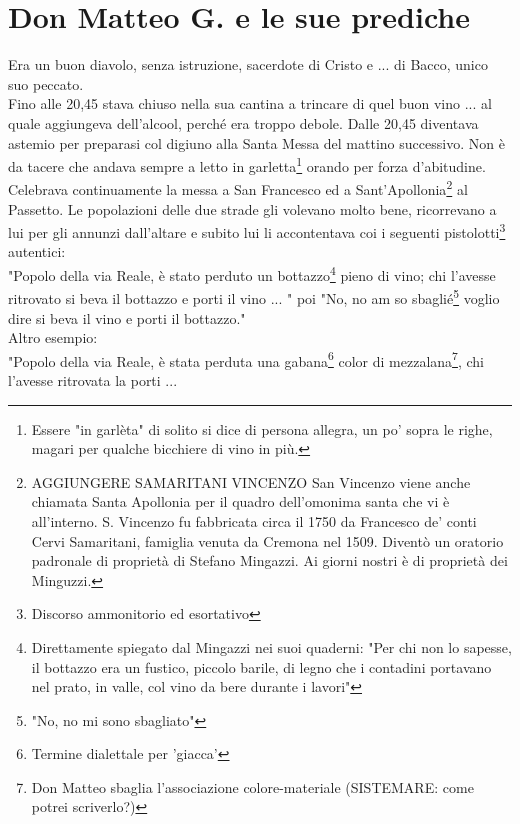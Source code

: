 \documentclass[10pt]{memoir} %
\begin{document}

\chapter{Don Matteo G. e le sue prediche}
Era un buon diavolo, senza istruzione, sacerdote di Cristo e ... di Bacco, unico suo peccato.\\
Fino alle 20,45 stava chiuso nella sua cantina a trincare di quel buon vino ... al quale aggiungeva dell'alcool, perché era troppo debole. Dalle 20,45 diventava astemio per preparasi col digiuno alla Santa Messa del mattino successivo. Non è da tacere che andava sempre a letto in garletta\footnote{Essere "in garlèta" di solito si dice di persona allegra, un po' sopra le righe, magari per qualche bicchiere di vino in più.} orando per forza d'abitudine. \\ Celebrava continuamente la messa a San Francesco ed a Sant'Apollonia\footnote{AGGIUNGERE SAMARITANI VINCENZO San Vincenzo viene anche chiamata Santa Apollonia per il quadro dell'omonima santa che vi è all'interno. S. Vincenzo fu fabbricata circa il 1750 da Francesco de' conti Cervi Samaritani, famiglia venuta da Cremona nel 1509. Diventò un oratorio padronale di proprietà di Stefano Mingazzi. Ai giorni nostri è di proprietà dei Minguzzi.} al Passetto. Le popolazioni delle due strade gli volevano molto bene, ricorrevano a lui per gli annunzi dall'altare e subito lui li accontentava coi i seguenti pistolotti\footnote{Discorso ammonitorio ed esortativo} autentici:\\
"Popolo della via Reale, è stato perduto un bottazzo\footnote{Direttamente spiegato dal Mingazzi nei suoi quaderni: "Per chi non lo sapesse, il bottazzo era un fustico, piccolo barile, di legno che i contadini portavano nel prato, in valle, col vino da bere durante i lavori"} pieno di vino; chi l'avesse ritrovato si beva il bottazzo e porti il vino ... " poi "No, no am so sbaglié\footnote{"No, no mi sono sbagliato"} voglio dire si beva il vino e porti il bottazzo."\\
Altro esempio:\\
"Popolo della via Reale, è stata perduta una gabana\footnote{Termine dialettale per 'giacca'} color di mezzalana\footnote{Don Matteo sbaglia l'associazione colore-materiale (SISTEMARE: come potrei scriverlo?)}, chi l'avesse ritrovata la porti ...\\
\end{document}
